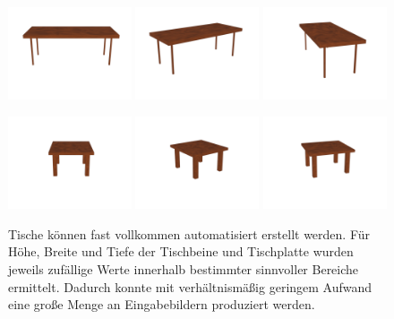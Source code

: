 \begin{figure}[h]
	\centering
	\includegraphics[width=0.325\textwidth]{bilder/random_table1_render4.png}
	\includegraphics[width=0.325\textwidth]{bilder/random_table1_render0.png}
	\includegraphics[width=0.325\textwidth]{bilder/random_table1_render2.png}

	\includegraphics[width=0.325\textwidth]{bilder/random_table11_render4.png}
	\includegraphics[width=0.325\textwidth]{bilder/random_table11_render0.png}
	\includegraphics[width=0.325\textwidth]{bilder/random_table11_render2.png}

	\caption[Generierte Tische]{Tische können fast vollkommen automatisiert erstellt werden. Für Höhe, Breite und Tiefe der Tischbeine und Tischplatte wurden jeweils zufällige Werte innerhalb bestimmter sinnvoller Bereiche ermittelt. Dadurch konnte mit verhältnismäßig geringem Aufwand eine große Menge an Eingabebildern produziert werden.}
	\label{fig:tables}
\end{figure}

